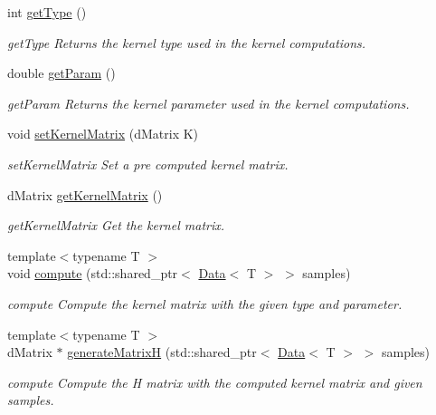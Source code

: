 \begin{DoxyCompactItemize}
int \mbox{\hyperlink{class_kernel_a5a2cb0fce0eda6c67a2325f6c8958da8}{get\+Type}} ()
\begin{DoxyCompactList}\small\item\em get\+Type Returns the kernel type used in the kernel computations. \end{DoxyCompactList}\item 
double \mbox{\hyperlink{class_kernel_a838e2cc5018fa702e59c52a3bf8ef813}{get\+Param}} ()
\begin{DoxyCompactList}\small\item\em get\+Param Returns the kernel parameter used in the kernel computations. \end{DoxyCompactList}\item 
void \mbox{\hyperlink{class_kernel_a3801cee0d86f25f1500d202f43a84b65}{set\+Kernel\+Matrix}} (d\+Matrix K)
\begin{DoxyCompactList}\small\item\em set\+Kernel\+Matrix Set a pre computed kernel matrix. \end{DoxyCompactList}\item 
d\+Matrix \mbox{\hyperlink{class_kernel_a5e398c63fee5f0e30b6dfb735c75e41a}{get\+Kernel\+Matrix}} ()
\begin{DoxyCompactList}\small\item\em get\+Kernel\+Matrix Get the kernel matrix. \end{DoxyCompactList}\item 
{\footnotesize template$<$typename T $>$ }\\void \mbox{\hyperlink{class_kernel_a214aeb35c89e67cf7677c61f7b0a843f}{compute}} (std\+::shared\+\_\+ptr$<$ \mbox{\hyperlink{class_data}{Data}}$<$ T $>$ $>$ samples)
\begin{DoxyCompactList}\small\item\em compute Compute the kernel matrix with the given type and parameter. \end{DoxyCompactList}\item 
{\footnotesize template$<$typename T $>$ }\\d\+Matrix $\ast$ \mbox{\hyperlink{class_kernel_a126dcd1fa57f69af243ca678170288b6}{generate\+MatrixH}} (std\+::shared\+\_\+ptr$<$ \mbox{\hyperlink{class_data}{Data}}$<$ T $>$ $>$ samples)
\begin{DoxyCompactList}\small\item\em compute Compute the H matrix with the computed kernel matrix and given samples. \end{DoxyCompactList}\item 

\end{DoxyCompactItemize}
